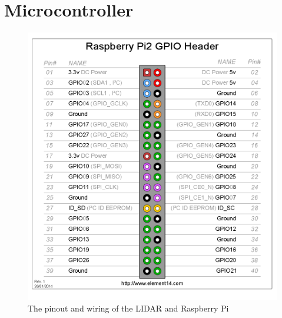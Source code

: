 \section{Microcontroller}


\begin{figure}[H]
	\centering
	\includegraphics[scale=.4]{images/GPIO_Pi2.png}
	\caption{The pinout and wiring of the LIDAR and Raspberry Pi}
	\label{fig:wiringlidarpi}
\end{figure}

